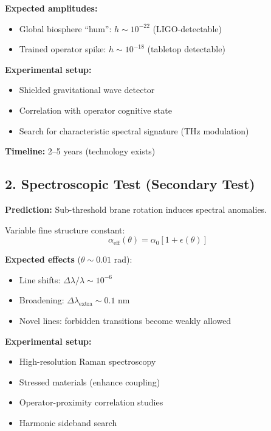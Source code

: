 \textbf{Expected amplitudes:}
\begin{itemize}
\item Global biosphere ``hum'': $h \sim 10^{-22}$ (LIGO-detectable)
\item Trained operator spike: $h \sim 10^{-18}$ (tabletop detectable)
\end{itemize}

\textbf{Experimental setup:}
\begin{itemize}
\item Shielded gravitational wave detector
\item Correlation with operator cognitive state
\item Search for characteristic spectral signature (THz modulation)
\end{itemize}

\textbf{Timeline:} 2--5 years (technology exists)

\subsection{2. Spectroscopic Test (Secondary Test)}
\label{subsec:spectro-test}

\textbf{Prediction:} Sub-threshold brane rotation induces spectral anomalies.

Variable fine structure constant:
\begin{equation}
\label{eq:alpha-eff}
\alpha_{\text{eff}}(\theta) = \alpha_0[1 + \epsilon(\theta)]
\end{equation}

\textbf{Expected effects} ($\theta \sim 0.01$ rad):
\begin{itemize}
\item Line shifts: $\Delta\lambda/\lambda \sim 10^{-6}$
\item Broadening: $\Delta\lambda_{\text{extra}} \sim 0.1$ nm
\item Novel lines: forbidden transitions become weakly allowed
\end{itemize}

\textbf{Experimental setup:}
\begin{itemize}
\item High-resolution Raman spectroscopy
\item Stressed materials (enhance coupling)
\item Operator-proximity correlation studies
\item Harmonic sideband search
\end{itemize}

